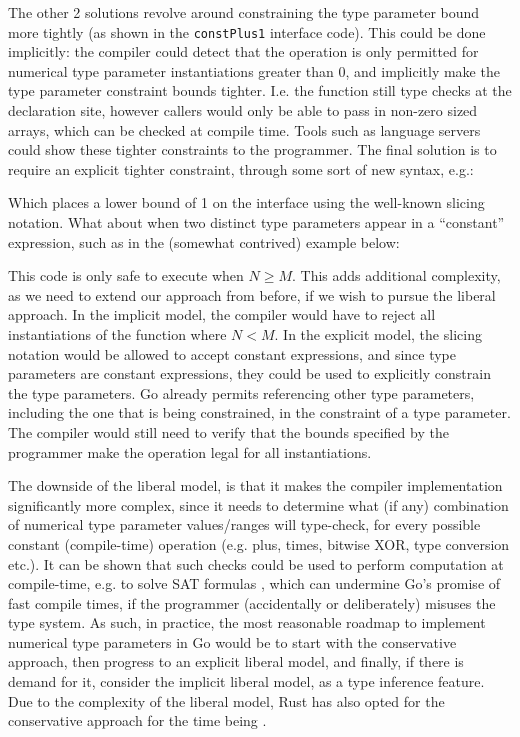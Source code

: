 The other 2 solutions revolve around constraining the type parameter bound more
tightly (as shown in the \texttt{constPlus1} interface code). This could be done
implicitly: the compiler could detect that the operation is only permitted for
numerical type parameter instantiations greater than 0, and implicitly make the
type parameter constraint bounds tighter. I.e. the function still type checks at
the declaration site, however callers would only be able to pass in non-zero
sized arrays, which can be checked at compile time. Tools such as language
servers could show these tighter constraints to the programmer. The final
solution is to require an explicit tighter constraint, through some sort of new
syntax, e.g.:


Which places a lower bound of 1 on the  interface using the well-known
slicing notation. What about when two distinct type parameters appear in a
``constant'' expression, such as in the (somewhat contrived) example below:


This code is only safe to execute when $N \ge M$. This adds additional
complexity, as we need to extend our approach from before, if we wish to pursue
the liberal approach. In the implicit model, the compiler would have to reject
all instantiations of the function where $N < M$. In the explicit model, the
slicing notation would be allowed to accept constant expressions, and since type
parameters are constant expressions, they could be used to explicitly constrain
the type parameters. Go already permits referencing other type parameters,
including the one that is being constrained, in the constraint of a type
parameter. The compiler would still need to verify that the bounds specified by
the programmer make the operation legal for all instantiations.


The downside of the liberal model, is that it makes the compiler implementation
significantly more complex, since it needs to determine what (if any)
combination of numerical type parameter values/ranges will type-check, for every
possible constant (compile-time) operation (e.g. plus, times, bitwise XOR, type
conversion etc.).
It can be shown that such checks could be used to perform computation at
compile-time, e.g. to solve SAT formulas \autocite{goArraySAT}, which can
undermine Go's promise of fast compile times, if the programmer (accidentally or
deliberately) misuses the type system. As such, in practice, the most reasonable
roadmap to implement numerical type parameters in Go would be to start with the
conservative approach, then progress to an explicit liberal model, and finally,
if there is demand for it, consider the implicit liberal model, as a type
inference feature. Due to the complexity of the liberal model, Rust has also
opted for the conservative approach for the time being \autocite{rustConstBlog}.

